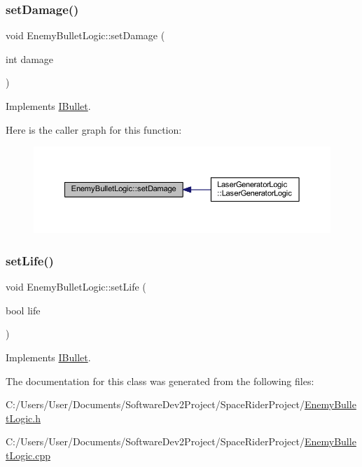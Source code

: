 \subsubsection{\texorpdfstring{set\+Damage()}{setDamage()}}
{\footnotesize\ttfamily void Enemy\+Bullet\+Logic\+::set\+Damage (\begin{DoxyParamCaption}\item[{int}]{damage }\end{DoxyParamCaption})\hspace{0.3cm}{\ttfamily [virtual]}}



Implements \hyperlink{class_i_bullet_a072298555accb47f11b84f4c781ae876}{I\+Bullet}.

Here is the caller graph for this function\+:
\nopagebreak
\begin{figure}[H]
\begin{center}
\leavevmode
\includegraphics[width=350pt]{class_enemy_bullet_logic_a3e4ce40e06e9fa23826bd74015fd75f2_icgraph}
\end{center}
\end{figure}
\mbox{\label{class_enemy_bullet_logic_a92e4dfb6a528114ad58f9ae64924fbab}} 
\subsubsection{\texorpdfstring{set\+Life()}{setLife()}}
{\footnotesize\ttfamily void Enemy\+Bullet\+Logic\+::set\+Life (\begin{DoxyParamCaption}\item[{bool}]{life }\end{DoxyParamCaption})\hspace{0.3cm}{\ttfamily [virtual]}}



Implements \hyperlink{class_i_bullet_abf99befdaa121e7c9ca2acc2ed75b513}{I\+Bullet}.



The documentation for this class was generated from the following files\+:\begin{DoxyCompactItemize}
\item 
C\+:/\+Users/\+User/\+Documents/\+Software\+Dev2\+Project/\+Space\+Rider\+Project/\hyperlink{_enemy_bullet_logic_8h}{Enemy\+Bullet\+Logic.\+h}\item 
C\+:/\+Users/\+User/\+Documents/\+Software\+Dev2\+Project/\+Space\+Rider\+Project/\hyperlink{_enemy_bullet_logic_8cpp}{Enemy\+Bullet\+Logic.\+cpp}\end{DoxyCompactItemize}

